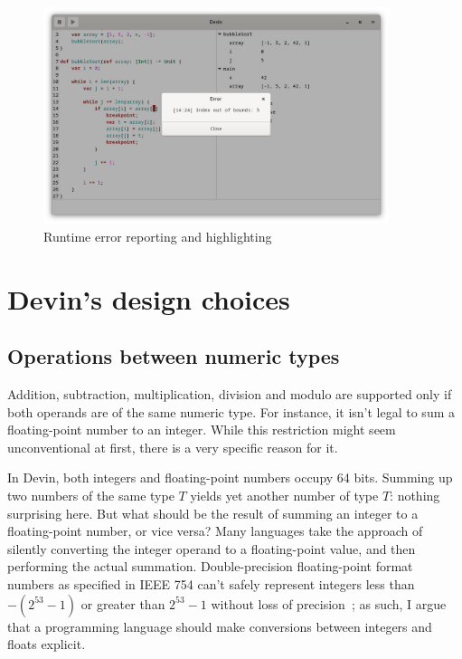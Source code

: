 \documentclass[UdineBachThesis,american,11pt]{PhdThesis}
\begin{document}
  \begin{figure}[H]
    \centering
    \includegraphics[width=0.9\textwidth]{6.png}
    \caption{Runtime error reporting and highlighting}
  \end{figure}

  \section{Devin's design choices}

  \subsection{Operations between numeric types}

  Addition, subtraction, multiplication, division and modulo are supported only
  if both operands are of the same numeric type. For instance, it isn't legal to
  sum a floating-point number to an integer. While this restriction might seem
  unconventional at first, there is a very specific reason for it.

  In Devin, both integers and floating-point numbers occupy 64 bits. Summing up
  two numbers of the same type $T$ yields yet another number of type $T$:
  nothing surprising here. But what should be the result of summing an integer
  to a floating-point number, or vice versa? Many languages take the approach of
  silently converting the integer operand to a floating-point value, and then
  performing the actual summation. Double-precision floating-point format
  numbers as specified in IEEE 754 can't safely represent integers less than
  \mbox{$-\left(2^{53} - 1\right)$} or greater than \mbox{$2^{53} - 1$} without
  loss of precision~\cite{mdn-is-safe-integer}; as such, I argue that a
  programming language should make conversions between integers and floats
  explicit.
\end{document}
